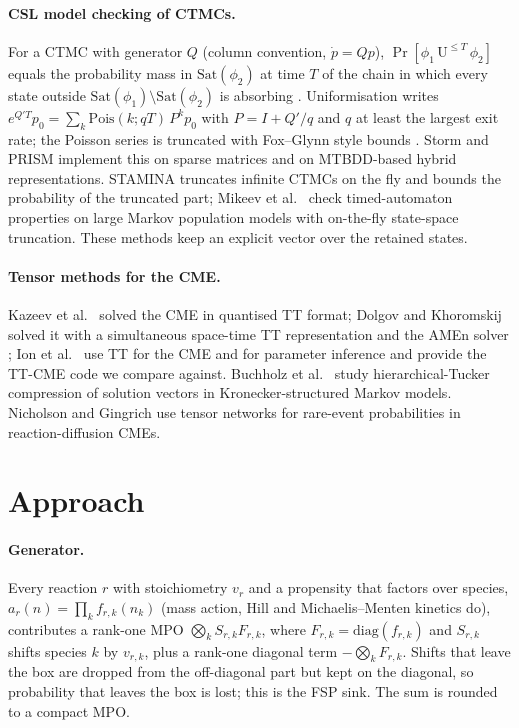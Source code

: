 \documentclass[11pt]{article}
\begin{document}
\paragraph{CSL model checking of CTMCs.} For a CTMC with generator $Q$ (column
convention, $\dot p = Qp$), $\Pr[\phi_1\,\mathrm{U}^{\le T}\,\phi_2]$ equals the
probability mass in $\mathrm{Sat}(\phi_2)$ at time $T$ of the chain in which every
state outside $\mathrm{Sat}(\phi_1)\setminus\mathrm{Sat}(\phi_2)$ is absorbing
\cite{baier2003csl}. Uniformisation writes $e^{Q'T}p_0=\sum_k
\mathrm{Pois}(k;qT)\,P^kp_0$ with $P=I+Q'/q$ and $q$ at least the largest exit rate;
the Poisson series is truncated with Fox--Glynn style bounds \cite{fox1988poisson}.
Storm and PRISM implement this on sparse matrices and on MTBDD-based hybrid
representations. STAMINA \cite{neupane2019stamina} truncates infinite CTMCs on the
fly and bounds the probability of the truncated part; Mikeev et al.\
\cite{mikeev2013dta} check timed-automaton properties on large Markov population
models with on-the-fly state-space truncation. These methods keep an explicit
vector over the retained states.

\paragraph{Tensor methods for the CME.} Kazeev et al.\ \cite{kazeev2014qtt} solved the
CME in quantised TT format; Dolgov and Khoromskij \cite{dolgov2015state} solved it
with a simultaneous space-time TT representation and the AMEn solver
\cite{dolgov2014amen}; Ion et al.\ \cite{ion2021ttcme} use TT for the CME and for
parameter inference and provide the TT-CME code we compare against. Buchholz et
al.\ \cite{buchholz2017compact} study hierarchical-Tucker compression of solution
vectors in Kronecker-structured Markov models. Nicholson and Gingrich
\cite{nicholson2023rare} use tensor networks for rare-event probabilities in
reaction-diffusion CMEs.

\section{Approach}\label{sec:approach}

\paragraph{Generator.} Every reaction $r$ with stoichiometry $v_r$ and a propensity
that factors over species, $a_r(n)=\prod_k f_{r,k}(n_k)$ (mass action, Hill and
Michaelis--Menten kinetics do), contributes a rank-one MPO
$\bigotimes_k S_{r,k}F_{r,k}$, where $F_{r,k}=\mathrm{diag}(f_{r,k})$ and $S_{r,k}$
shifts species $k$ by $v_{r,k}$, plus a rank-one diagonal term $-\bigotimes_k F_{r,k}$.
Shifts that leave the box are dropped from the off-diagonal part but kept on the
diagonal, so probability that leaves the box is lost; this is the FSP sink. The sum
is rounded to a compact MPO.
\end{document}
